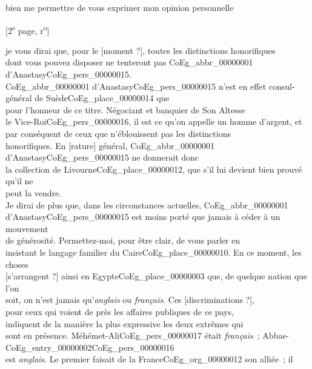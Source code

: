 \documentclass{book}
\begin{document}
bien me permettre de vous exprimer mon opinion personnelle
{\footnotesize \begin{center} [2\textsuperscript{e} page, r\textsuperscript{o}]\end{center}}
\noindent je vous dirai que, pour le [moment ?], toutes les distinctions honorifiques\\
dont vous pouvez disposer ne tenteront pas \gls{CoEg_abbr_00000001} d’Anastasy\gls{CoEg_pers_00000015}.\\
\indent \gls{CoEg_abbr_00000001} d’Anastasy\gls{CoEg_pers_00000015} n’est en effet consul-général de Suède\gls{CoEg_place_00000014} que\\
pour l’honneur de ce titre. Négociant et banquier de Son Altesse\\
le Vice-Roi\gls{CoEg_pers_00000016}, il est ce qu’on appelle un homme d’argent, et\\
par conséquent de ceux que n’éblouissent pas les distinctions\\
honorifiques. En [rature] général, \gls{CoEg_abbr_00000001} d’Anastasy\gls{CoEg_pers_00000015} ne donnerait donc\\
la collection de Livourne\gls{CoEg_place_00000012}, que s’il lui devient bien prouvé qu’il ne\\
peut la vendre.\\
\indent Je dirai de plus que, dans les circonstances actuelles, \gls{CoEg_abbr_00000001}\\
d’Anastasy\gls{CoEg_pers_00000015} est moins porté que jamais à céder à un mouvement\\
de générosité. Permettez-moi, pour être clair, de vous parler en\\
insistant le langage familier du Caire\gls{CoEg_place_00000010}. En ce moment, les choses\\
{[s’arrangent ?]} ainsi en Egypte\gls{CoEg_place_00000003} que, de quelque nation que l’on\\
soit, on n’est jamais qu’\textit{anglais} ou \textit{français}. Ces [discriminations ?],\\
pour ceux qui voient de près les affaires publiques de ce pays,\\
indiquent de la manière la plus expressive les deux extrêmes qui\\
sont en présence. Méhémet-Ali\gls{CoEg_pers_00000017} était \textit{français}~; Abbas-\Gls{CoEg_entry_00000002}\gls{CoEg_pers_00000016}\\
est \textit{anglais}. Le premier faisait de la France\gls{CoEg_org_00000012} son alliée~; il\\
\end{document}
